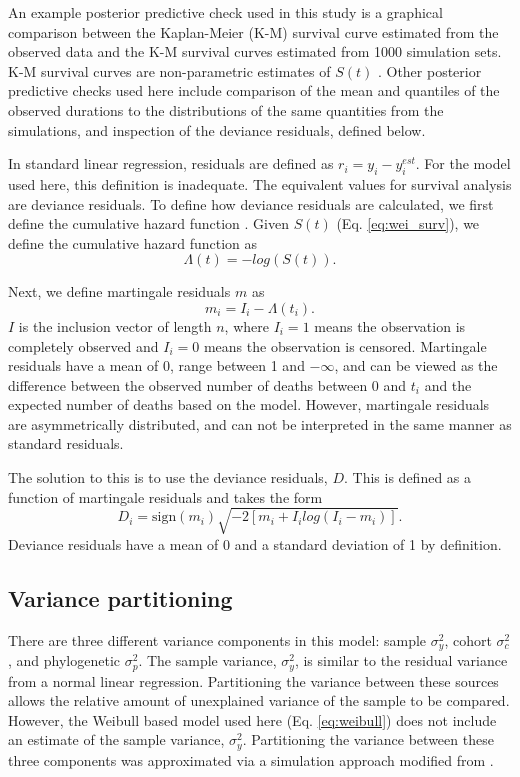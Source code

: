 \documentclass{article}
\begin{document}
An example posterior predictive check used in this study is a graphical comparison between the Kaplan-Meier (K-M) survival curve estimated from the observed data and the K-M survival curves estimated from 1000 simulation sets. K-M survival curves are non-parametric estimates of \(S(t)\) \cite{Klein2003}. Other posterior predictive checks used here include comparison of the mean and quantiles of the observed durations to the distributions of the same quantities from the simulations, and inspection of the deviance residuals, defined below.

In standard linear regression, residuals are defined as \(r_{i} = y_{i} - y_{i}^{est}\). For the model used here, this definition is inadequate. The equivalent values for survival analysis are deviance residuals. To define how deviance residuals are calculated, we first define the cumulative hazard function \cite{Klein2003}. Given \(S(t)\) (Eq. \ref{eq:wei_surv}), we define the cumulative hazard function as 
\begin{equation*}
  \Lambda(t) = -log\left(S\left(t\right)\right).
\end{equation*}

Next, we define martingale residuals \(m\) as
\begin{equation*}
  m_{i} = I_{i} - \Lambda(t_i).
\end{equation*}
\(I\) is the inclusion vector of length \(n\), where \(I_{i} = 1\) means the observation is completely observed and \(I_{i} = 0\) means the observation is censored. Martingale residuals have a mean of 0, range between 1 and \(-\infty\), and can be viewed as the difference between the observed number of deaths between 0 and \(t_{i}\) and the expected number of deaths based on the model. However, martingale residuals are asymmetrically distributed, and can not be interpreted in the same manner as standard residuals. 

The solution to this is to use the deviance residuals, \(D\). This is defined as a function of martingale residuals and takes the form
\begin{equation*}
  D_{i} = \text{sign}(m_{i}) \sqrt{-2[m_{i} + I_{i}log(I_{i} - m_{i})]}.
\end{equation*}
Deviance residuals have a mean of 0 and a standard deviation of 1 by definition.


\subsection{Variance partitioning}
There are three different variance components in this model: sample \(\sigma_{y}^{2}\), cohort \(\sigma_{c}^{2}\), and phylogenetic \(\sigma_{p}^{2}\). The sample variance, \(\sigma_{y}^{2}\), is similar to the residual variance from a normal linear regression. Partitioning the variance between these sources allows the relative amount of unexplained variance of the sample to be compared. However, the Weibull based model used here (Eq. \ref{eq:weibull}) does not include an estimate of the sample variance, \(\sigma_{y}^{2}\). Partitioning the variance between these three components was approximated via a simulation approach modified from \cite{Goldstein2002}.
\end{document}
